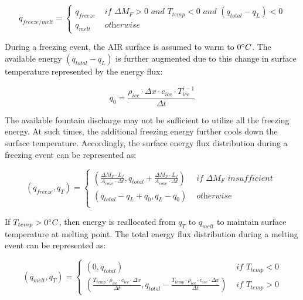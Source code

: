 \documentclass[utf8]{frontiersSCNS}
\begin{document}
\begin{equation}
	q_{freeze/melt} = \left\{ \begin{array}{ll}
		q_{freeze} & \textit{ if } \Delta M_{F} > 0 \textit{ and } T_{temp} < 0 \textit{ and }(q_{total}-q_{L}) < 0 \\
		q_{melt}   & \textit{ otherwise}
	\end{array} \right.
\end{equation}

During a freezing event, the AIR surface is assumed to warm to $0 \degree C$. The available energy
$(q_{total}-q_{L})$ is further augmented due to this change in surface temperature represented by the energy
flux:

$$q_{0} = \frac{\rho_{ice} \cdot \Delta x \cdot c_{ice} \cdot T_{ice}^{i-1}}{\Delta t}$$

The available fountain discharge may not be sufficient to utilize all the freezing energy. At such times, 
the additional freezing energy further cools down the surface temperature. Accordingly, the surface energy flux
distribution during a freezing event can be represented as:

\begin{equation}
	(q_{freeze}, q_{T}) = \left\{ \begin{array}{ll}
		(\frac{\Delta M_{F} \cdot L_f
		}{A_{cone} \cdot \Delta t}
		, q_{total}+\frac{\Delta M_{F} \cdot L_f
		}{A_{cone} \cdot \Delta t})          & \textit{ if  } \Delta M_{F} \textit{ insufficient }\\
		(q_{total}-q_{L}+q_{0}, q_{L}-q_{0}) & \textit{ otherwise }                                                                      \\
	\end{array} \right.
\end{equation}

If $T_{temp} > 0 \degree C$, then energy is reallocated from $q_{T}$ to $q_{melt}$ to maintain surface
temperature at melting point. The total energy flux distribution during a melting event can be represented as:

\begin{equation}
	(q_{melt}, q_{T}) = \left\{ \begin{array}{ll}
		(0, q_{total})                                                                                                                                                 & \textit{ if } T_{temp} < 0 \\
		(\frac{T_{temp} \cdot \rho_{ice} \cdot c_{ice} \cdot \Delta x}{\Delta t}, q_{total}-\frac{T_{temp} \cdot \rho_{ice} \cdot c_{ice} \cdot \Delta x}{\Delta t}  ) & \textit{ if } T_{temp} > 0
	\end{array} \right.
\end{equation}
\end{document}
